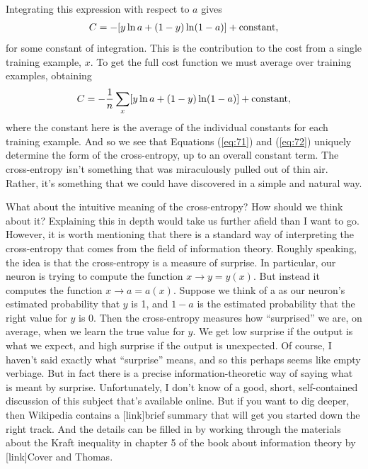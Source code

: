 \documentclass[a4paper,twoside,10pt]{book}
\begin{document}
Integrating this expression with respect to $a$ gives
\begin{eqnarray}
C = -[y \ln a + (1-y) \ln (1-a)]+ {\rm constant},
\label{eq:76}\end{eqnarray}
for some constant of integration. This is the contribution to the cost from a single training example, $x$. To get the full cost function we must average over training examples, obtaining
\begin{eqnarray}
C = -\frac{1}{n} \sum_x [y \ln a +(1-y) \ln(1-a)] + {\rm constant},
\label{eq:77}\end{eqnarray}
where the constant here is the average of the individual constants for each training example. And so we see that Equations (\ref{eq:71}) and (\ref{eq:72}) uniquely determine the form of the cross-entropy, up to an overall constant term. The cross-entropy isn't something that was miraculously pulled out of thin air. Rather, it's something that we could have discovered in a simple and natural way.

What about the intuitive meaning of the cross-entropy? How should we think about it? Explaining this in depth would take us further afield than I want to go. However, it is worth mentioning that there is a standard way of interpreting the cross-entropy that comes from the field of information theory. Roughly speaking, the idea is that the cross-entropy is a measure of surprise. In particular, our neuron is trying to compute the function $x\to y=y(x)$. But instead it computes the function $x \to a=a(x)$. Suppose we think of a as our neuron's estimated probability that $y$ is 1, and $1-a$ is the estimated probability that the right value for $y$ is 0. Then the cross-entropy measures how ``surprised'' we are, on average, when we learn the true value for $y$. We get low surprise if the output is what we expect, and high surprise if the output is unexpected. Of course, I haven't said exactly what ``surprise'' means, and so this perhaps seems like empty verbiage. But in fact there is a precise information-theoretic way of saying what is meant by surprise. Unfortunately, I don't know of a good, short, self-contained discussion of this subject that's available online. But if you want to dig deeper, then Wikipedia contains a [link]brief summary that will get you started down the right track. And the details can be filled in by working through the materials about the Kraft inequality in chapter 5 of the book about information theory by [link]Cover and Thomas.
\end{document}
